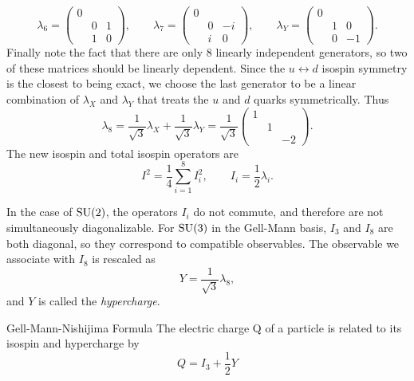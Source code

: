 \begin{equation}
  \lambda_6=\left(\begin{array}{ccc}
            0 &   &  \\
              & 0 & 1\\
              & 1 & 0
            \end{array}\right), \qquad
  \lambda_7=\left(\begin{array}{ccc}
            0 &    &   \\
              & 0  & -i\\
              & i  & 0
            \end{array}\right), \qquad
  \lambda_Y=\left(\begin{array}{ccc}
           0  &    &  \\
              & 1  & 0\\
              & 0  & -1 
            \end{array}\right).
\end{equation}
Finally note the fact that there are only 8 linearly independent generators, so
two of these matrices should be linearly dependent. Since the
$u\leftrightarrow d$ isospin symmetry is the closest to being exact, we choose
the last generator to be a linear combination of $\lambda_X$ and $\lambda_Y$
that treats the $u$ and $d$ quarks symmetrically. Thus
\begin{equation}
  \lambda_8=\frac{1}{\sqrt{3}}\lambda_X+\frac{1}{\sqrt{3}}\lambda_Y
           =\frac{1}{\sqrt{3}}\left(\begin{array}{ccc}
            1 &   &   \\
              & 1 &   \\
              &   & -2
            \end{array}\right).
\end{equation}
The new isospin and total isospin operators are
\begin{equation}
  I^2=\frac{1}{4}\sum\limits_{i=1}^8 I_i^2, \qquad I_i=\frac{1}{2}\lambda_i.
\end{equation}

In the case of $\operatorname{SU}(2)$, the operators $I_i$ do not commute, and therefore are
not simultaneously diagonalizable. For $\operatorname{SU}(3)$ in the Gell-Mann basis,
$I_3$ and $I_8$ are both diagonal, so they correspond to compatible
observables. The observable we associate with $I_8$ is rescaled as
\begin{equation}
  Y=\frac{1}{\sqrt{3}}\lambda_8,
\end{equation}
and $Y$ is called the {\it hypercharge}.
\begin{theorem}{Gell-Mann-Nishijima Formula}{}
  The electric charge Q of a particle is related to its isospin and
  hypercharge by
  \begin{equation*}
    Q=I_3+\frac{1}{2}Y
  \end{equation*}
\end{theorem}

